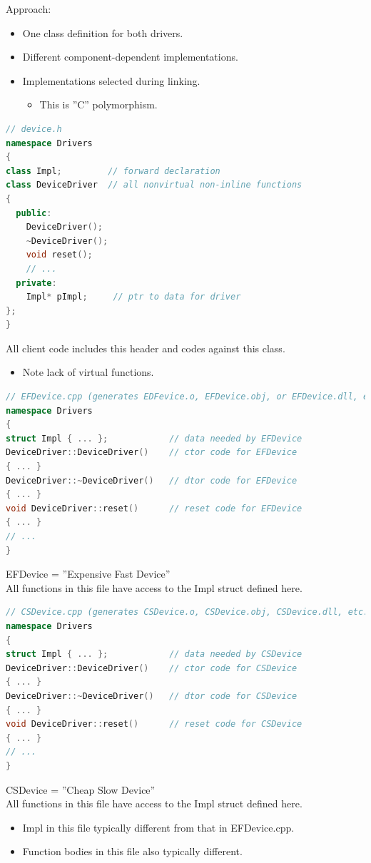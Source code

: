 Approach:
\begin{itemize}
  \item One class definition for both drivers.
  \item Different component-dependent implementations.
  \item Implementations selected during linking.
  \begin{itemize}
    \item This is ''C'' polymorphism.
  \end{itemize}
\end{itemize}
\begin{lstlisting}[language=C++]
// device.h
namespace Drivers
{
class Impl;         // forward declaration
class DeviceDriver  // all nonvirtual non-inline functions
{
  public:
    DeviceDriver();
    ~DeviceDriver();
    void reset();
    // ...
  private:
    Impl* pImpl;     // ptr to data for driver
};
}
\end{lstlisting}
All client code includes this header and codes against this class.
\begin{itemize}
  \item Note lack of virtual functions.
\end{itemize}
\begin{lstlisting}[language=C++]
// EFDevice.cpp (generates EDFevice.o, EFDevice.obj, or EFDevice.dll, etc.)
namespace Drivers
{
struct Impl { ... };            // data needed by EFDevice
DeviceDriver::DeviceDriver()    // ctor code for EFDevice
{ ... }
DeviceDriver::~DeviceDriver()   // dtor code for EFDevice
{ ... }
void DeviceDriver::reset()      // reset code for EFDevice
{ ... }
// ...
}
\end{lstlisting}
EFDevice = ''Expensive Fast Device''\\
All functions in this file have access to the Impl struct defined here.

\begin{lstlisting}[language=C++]
// CSDevice.cpp (generates CSDevice.o, CSDevice.obj, CSDevice.dll, etc.)
namespace Drivers
{
struct Impl { ... };            // data needed by CSDevice
DeviceDriver::DeviceDriver()    // ctor code for CSDevice
{ ... }
DeviceDriver::~DeviceDriver()   // dtor code for CSDevice
{ ... }
void DeviceDriver::reset()      // reset code for CSDevice
{ ... }
// ...
}
\end{lstlisting}
CSDevice = ''Cheap Slow Device''\\
All functions in this file have access to the Impl struct defined here.
\begin{itemize}
  \item Impl in this file typically different from that in EFDevice.cpp.
  \item Function bodies in this file also typically different.
\end{itemize}

